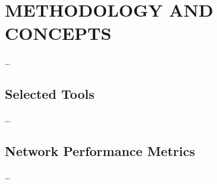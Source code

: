 
\section{METHODOLOGY AND CONCEPTS} \label{sec:methodology-and-concepts}


    \ldots

    \subsection{Selected Tools} \label{subsec:selected-tools}

        \ldots

    \subsection{Network Performance Metrics} \label{subsec:network-performance-metrics}
    
        \ldots

